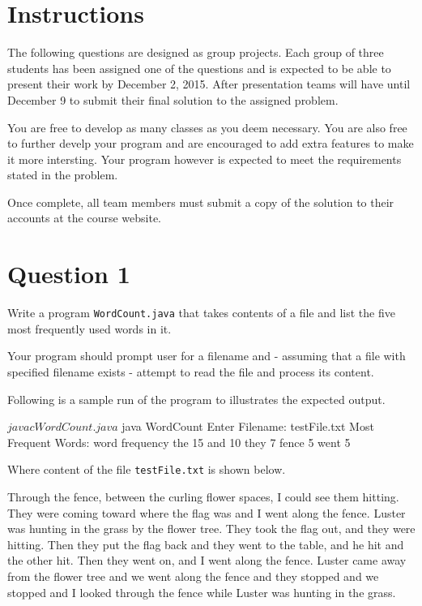 \documentclass[12pt,letterpaper,twoside]{article}
\begin{document}


\section*{Instructions}

The following questions are designed as group projects.
Each group of three students has been assigned one of the questions and is expected to be able to present their work by December 2, 2015.
After presentation teams will have until December 9 to submit their final solution to the assigned problem.

You are free to develop as many classes as you deem necessary.
You are also free to further develp your program and are encouraged to add extra features to make it more intersting.
Your program however is expected to meet the requirements stated in the problem.

Once complete, all team members must submit a copy of the solution to their accounts at the course website.

\section*{Question 1}

Write a program \texttt{WordCount.java} that takes contents of a file and list the five most frequently used words in it.

Your program should prompt user for a filename and - assuming that a file with specified filename exists - attempt to read the file and process its content.

Following is a sample run of the program to illustrates the expected output.

\begin{terminal}
$ javac WordCount.java
$ java WordCount
Enter Filename: testFile.txt
Most Frequent Words:
word            frequency
the             15
and             10
they            7
fence           5
went            5
\end{terminal}

Where content of the file \texttt{testFile.txt} is shown below.

\begin{displayquote}
Through the fence, between the curling flower spaces, I could see them hitting.
They were coming toward where the flag was and I went along the fence.
Luster was hunting in the grass by the flower tree.
They took the flag out, and they were hitting.
Then they put the flag back and they went to the table, and he hit and the other hit.
Then they went on, and I went along the fence.
Luster came away from the flower tree and we went along the fence and they stopped and we stopped and I looked through the fence while Luster was hunting in the grass.
\end{displayquote}
\end{document}
